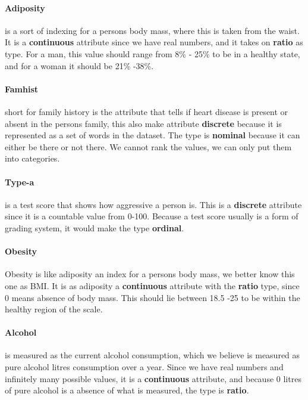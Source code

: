 \paragraph{Adiposity} is a sort of indexing for a persons body mass, where this is taken from the waist. It is a \textbf{continuous} attribute since we have real numbers, and it takes on \textbf{ratio} as type. For a man, this value should range from 8\% - 25\% to be in a healthy state, and for a woman it should be 21\% -38\%.

\paragraph{Famhist} short for family history is the attribute that tells if heart disease is present or absent in the persons family, this also make attribute \textbf{discrete} because it is represented as a set of words in the dataset. The type is \textbf{nominal} because it can either be there or not there. We cannot rank the values, we can only put them into categories.

\paragraph{Type-a} is a test score that shows how aggressive a person is. This is a \textbf{discrete} attribute since it is a countable value from 0-100. Because a test score usually is a form of grading system, it would make the type \textbf{ordinal}.

\paragraph{Obesity} Obesity is like adiposity an index for a persons body mass, we better know this one as BMI. It is as adiposity a \textbf{continuous} attribute with the \textbf{ratio} type, since 0 means absence of body mass. This should lie between 18.5 -25 to be within the healthy region of the scale.

\paragraph{Alcohol} is measured as the current alcohol consumption, which we believe is measured as pure alcohol litres consumption over a year. Since we have real numbers and infinitely many possible values, it is a \textbf{continuous} attribute, and because 0 litres of pure alcohol is a absence of what is measured, the type is \textbf{ratio}.

